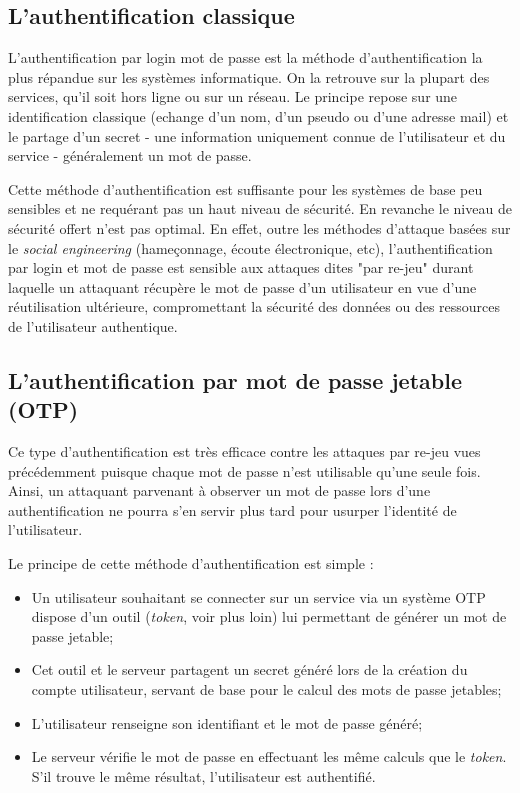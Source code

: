 \subsection{L'authentification classique}
	
	L'authentification par login \/ mot de passe est la méthode d'authentification
	la plus répandue sur les systèmes informatique. On la retrouve sur la plupart des
	services, qu'il soit hors ligne ou sur un réseau. Le principe repose sur une
  identification classique (echange d'un nom, d'un pseudo ou d'une adresse mail) et le
  partage d'un secret - une information uniquement connue de l'utilisateur et du service
  - généralement un mot de passe.
	
	Cette méthode d'authentification est suffisante pour les systèmes de base peu
	sensibles et ne requérant pas un haut niveau de sécurité.	En revanche le niveau de 
	sécurité offert n'est pas optimal. En effet, outre les méthodes d'attaque basées sur 
	le \emph{social engineering} (hameçonnage, écoute électronique, etc), 
	l'authentification par login et mot de passe est sensible aux attaques dites "par 
	re-jeu" durant laquelle un attaquant récupère le mot de passe d'un utilisateur en vue
	d'une	réutilisation ultérieure, compromettant la sécurité des données ou des ressources
	de l'utilisateur authentique.

\subsection{L'authentification par mot de passe jetable (OTP)}

	Ce type d'authentification est très efficace contre les attaques par re-jeu vues 
	précédemment puisque chaque mot de passe n'est utilisable qu'une seule fois. Ainsi, un 
	attaquant parvenant à observer un mot de passe lors d'une authentification ne pourra
	s'en servir plus tard pour usurper l'identité de l'utilisateur. 
	
	Le principe de cette méthode d'authentification est simple :
	\begin{itemize}
		\item Un utilisateur souhaitant se connecter sur un service via un système 
		OTP dispose d'un outil (\emph{token}, voir plus loin) lui permettant de générer 
		un mot de passe jetable;
		\item Cet outil et le serveur partagent un secret généré lors de la création 
		du compte utilisateur, servant de base pour le calcul des mots de passe jetables;
		\item L'utilisateur renseigne son identifiant et le mot de passe généré;
		\item Le serveur vérifie le mot de passe en effectuant les même calculs que le 
		\emph{token}. S'il trouve le même résultat, l'utilisateur est authentifié.
	\end{itemize}
	
